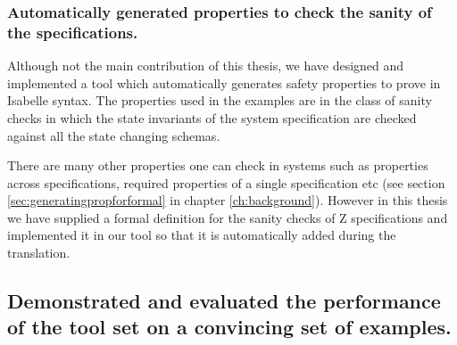%

\subsubsection{Automatically generated properties to check the sanity of the specifications.}

Although not the main contribution of this thesis, we have designed and implemented a tool which automatically generates safety properties to prove in Isabelle syntax. The properties used in the examples are in the class of sanity checks in which the state invariants of the system specification are checked against all the state changing schemas.

There are many other properties one can check in systems such as properties across specifications, required properties of a single specification etc (see section \ref{sec:generatingpropforformal} in chapter \ref{ch:background}). However in this thesis we have supplied a formal definition for the sanity checks of Z specifications and implemented it in our tool so that it is automatically added during the translation.


\subsection{Demonstrated and evaluated the performance of the tool set on a convincing set of examples.}

